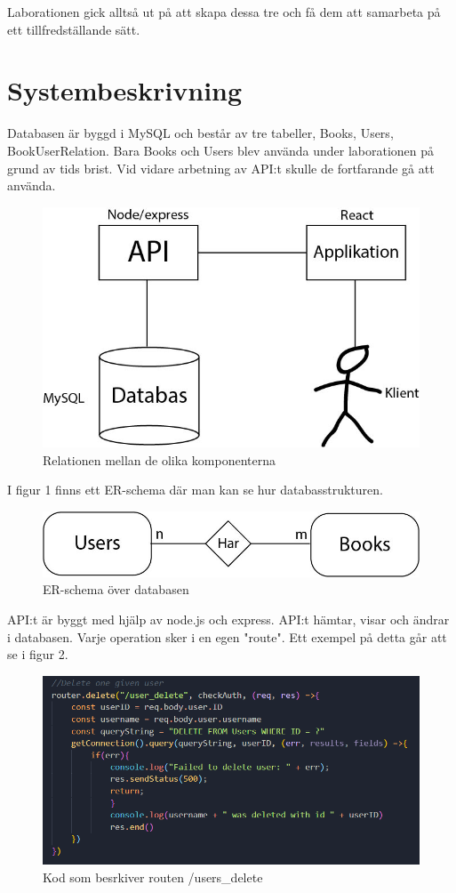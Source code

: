 \documentclass{article}
\begin{document}
\noindent
Laborationen gick alltså ut på att skapa dessa tre och få dem att samarbeta på ett tillfredställande sätt.


\section{Systembeskrivning}%
\label{sec:systembeskrivning}
Databasen är byggd i MySQL och består av tre tabeller, Books, Users, BookUserRelation. Bara Books och Users blev använda under laborationen på grund av tids brist. Vid vidare arbetning av API:t skulle de fortfarande gå att använda.\newline
\begin{figure}[H]
	\centering
	\includegraphics[width=0.8\linewidth]{Images/relation.jpg}
	\caption{Relationen mellan de olika komponenterna}
	\label{fig:}
\end{figure}
\noindent
I figur 1 finns ett ER-schema där man kan se hur databasstrukturen.
\begin{figure}[H]
	\centering
	\includegraphics[width=0.8\linewidth]{Images/er-shema.jpg}
	\caption{ER-schema över databasen}
	\label{fig:}
\end{figure}

\noindent
API:t är byggt med hjälp av node.js och express. API:t hämtar, visar och ändrar i databasen. Varje operation sker i en egen "route". Ett exempel på detta går att se i figur 2. 
\begin{figure}[H]
	\centering
	\includegraphics[width=0.8\linewidth]{Images/user_delete_route.PNG}
	\caption{Kod som besrkiver routen /users\_delete}
	\label{fig:}
\end{figure}
\end{document}
